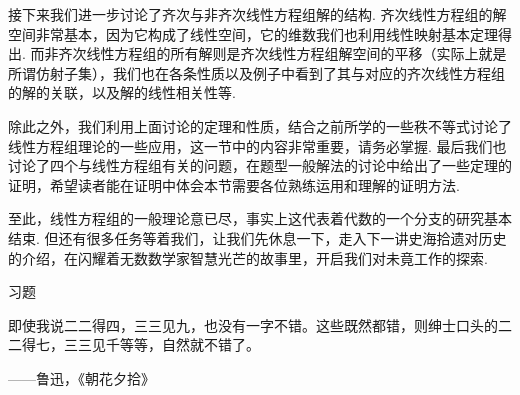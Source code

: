 接下来我们进一步讨论了齐次与非齐次线性方程组解的结构. 齐次线性方程组的解空间非常基本，因为它构成了线性空间，它的维数我们也利用线性映射基本定理得出. 而非齐次线性方程组的所有解则是齐次线性方程组解空间的平移（实际上就是所谓仿射子集），我们也在各条性质以及例子中看到了其与对应的齐次线性方程组的解的关联，以及解的线性相关性等.

除此之外，我们利用上面讨论的定理和性质，结合之前所学的一些秩不等式讨论了线性方程组理论的一些应用，这一节中的内容非常重要，请务必掌握. 最后我们也讨论了四个与线性方程组有关的问题，在题型一般解法的讨论中给出了一些定理的证明，希望读者能在证明中体会本节需要各位熟练运用和理解的证明方法.

至此，线性方程组的一般理论意已尽，事实上这代表着代数的一个分支的研究基本结束. 但还有很多任务等着我们，让我们先休息一下，走入下一讲史海拾遗对历史的介绍，在闪耀着无数数学家智慧光芒的故事里，开启我们对未竟工作的探索.

\vspace{2ex}
\centerline{\heiti \Large 习题}

\vspace{2ex}
{\kaishu 即使我说二二得四，三三见九，也没有一字不错。这些既然都错，则绅士口头的二二得七，三三见千等等，自然就不错了。}
\begin{flushright}
    \kaishu
    ——鲁迅，《朝花夕拾》
\end{flushright}

